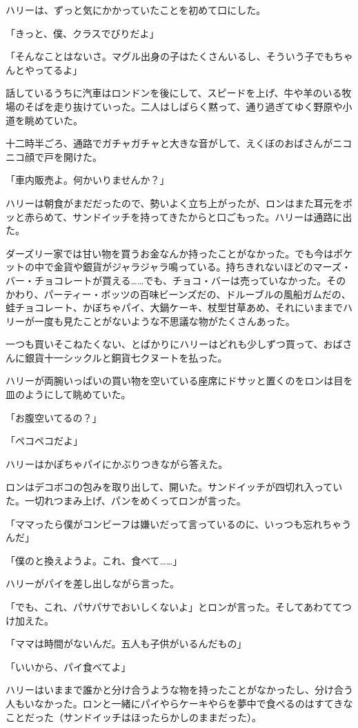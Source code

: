 \documentclass[10pt,a4paper]{article}
\begin{document}
\begin{CJK}{UTF8}{min}
ハリーは、ずっと気にかかっていたことを初めて口にした。

「きっと、僕、クラスでびりだよ」

「そんなことはないさ。マグル出身の子はたくさんいるし、そういう子でもちゃんとやってるよ」

話しているうちに汽車はロンドンを後にして、スピードを上げ、牛や羊のいる牧場のそばを走り抜けていった。二人はしばらく黙って、通り過ぎてゆく野原や小道を眺めていた。

十二時半ごろ、通路でガチャガチャと大きな音がして、えくぼのおばさんがニコニコ顔で戸を開けた。

「車内販売よ。何かいりませんか？」

ハリーは朝食がまだだったので、勢いよく立ち上がったが、ロンはまた耳元をポッと赤らめて、サンドイッチを持ってきたからと口ごもった。ハリーは通路に出た。

ダーズリー家では甘い物を買うお金なんか持ったことがなかった。でも今はポケットの中で金貨や銀貨がジャラジャラ鳴っている。持ちきれないほどのマーズ・バー・チョコレートが買える……でも、チョコ・バーは売っていなかった。そのかわり、パーティー・ボッツの百味ビーンズだの、ドルーブルの風船ガムだの、蛙チョコレート、かぼちゃパイ、大鍋ケーキ、杖型甘草あめ、それにいままでハリーが一度も見たことがないような不思議な物がたくさんあった。

一つも買いそこねたくない、とばかりにハリーはどれも少しずつ買って、おばさんに銀貨十一シックルと銅貨七クヌートを払った。

ハリーが両腕いっぱいの買い物を空いている座席にドサッと置くのをロンは目を皿のようにして眺めていた。

「お腹空いてるの？」

「ペコペコだよ」

ハリーはかぽちゃパイにかぶりつきながら答えた。

ロンはデコボコの包みを取り出して、開いた。サンドイッチが四切れ入っていた。一切れつまみ上げ、パンをめくってロンが言った。

「ママったら僕がコンビーフは嫌いだって言っているのに、いっつも忘れちゃうんだ」

「僕のと換えようよ。これ、食べて……」

ハリーがパイを差し出しながら言った。

「でも、これ、パサパサでおいしくないよ」とロンが言った。そしてあわててつけ加えた。

「ママは時間がないんだ。五人も子供がいるんだもの」

「いいから、パイ食べてよ」

ハリーはいままで誰かと分け合うような物を持ったことがなかったし、分け合う人もいなかった。ロンと一緒にパイやらケーキやらを夢中で食べるのはすてきなことだった（サンドイッチはほったらかしのままだった）。


\end{CJK}
\end{document}
